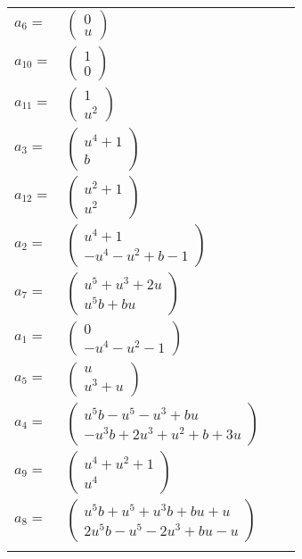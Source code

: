\documentclass[1p]{elsarticle_modified}
\theoremstyle{definition}
\begin{document}
\begin{tabular}{m{7pt} m{180pt} m{7pt} m{180pt} }
\flushright $a_{6}=$&$\begin{pmatrix}0\\u\end{pmatrix}$ \\
\flushright $a_{10}=$&$\begin{pmatrix}1\\0\end{pmatrix}$ \\
\flushright $a_{11}=$&$\begin{pmatrix}1\\u^2\end{pmatrix}$ \\
\flushright $a_{3}=$&$\begin{pmatrix}u^4+1\\b\end{pmatrix}$ \\
\flushright $a_{12}=$&$\begin{pmatrix}u^2+1\\u^2\end{pmatrix}$ \\
\flushright $a_{2}=$&$\begin{pmatrix}u^4+1\\- u^4- u^2+b-1\end{pmatrix}$ \\
\flushright $a_{7}=$&$\begin{pmatrix}u^5+u^3+2 u\\u^5 b+b u\end{pmatrix}$ \\
\flushright $a_{1}=$&$\begin{pmatrix}0\\- u^4- u^2-1\end{pmatrix}$ \\
\flushright $a_{5}=$&$\begin{pmatrix}u\\u^3+u\end{pmatrix}$ \\
\flushright $a_{4}=$&$\begin{pmatrix}u^5 b- u^5- u^3+b u\\- u^3 b+2 u^3+u^2+b+3 u\end{pmatrix}$ \\
\flushright $a_{9}=$&$\begin{pmatrix}u^4+u^2+1\\u^4\end{pmatrix}$ \\
\flushright $a_{8}=$&$\begin{pmatrix}u^5 b+u^5+u^3 b+b u+u\\2 u^5 b- u^5-2 u^3+b u- u\end{pmatrix}$\\&\end{tabular}
\end{document}
